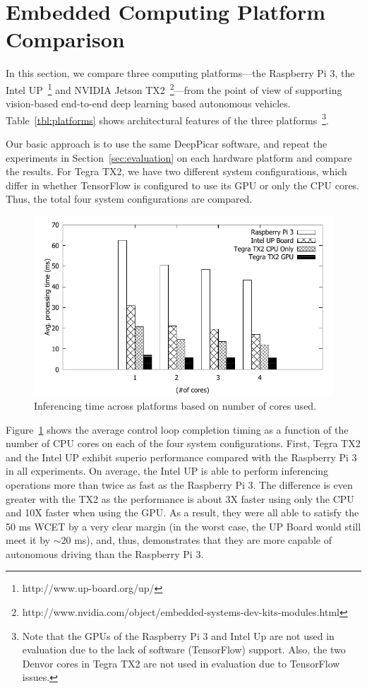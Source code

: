 
%

\section{Embedded Computing Platform Comparison}\label{sec:comparison}

In this section, we compare three computing platforms---the Raspberry
Pi 3, the Intel UP~\footnote{http://www.up-board.org/up/} and NVIDIA
Jetson
TX2~\footnote{http://www.nvidia.com/object/embedded-systems-dev-kits-modules.html}---from
the point of view of supporting vision-based end-to-end deep learning
based autonomous vehicles. 
Table~\ref{tbl:platforms} shows architectural features of the three
platforms~\footnote{Note that the GPUs of the Raspberry Pi 3 and Intel
  Up are not used in evaluation due to the lack of software (TensorFlow)
support. Also, the two Denvor cores in Tegra TX2 are not used in
evaluation due to TensorFlow issues.}.
  
Our basic approach is to use the same DeepPicar software, and repeat
the experiments in Section~\ref{sec:evaluation} on each hardware
platform and compare the results. 
For Tegra TX2, we have two different system configurations,
which differ in whether TensorFlow is configured to use its GPU or
only the CPU cores. Thus, the total four system configurations are
compared.

\begin{figure}[h]
  \centering
  \includegraphics[width=.5\textwidth]{figs/compare_core}
  \caption{Inferencing time across platforms based on number of cores 
used.}
  \label{fig:sys_core}
\end{figure}

Figure~\ref{fig:sys_core} shows the average control loop completion
timing as a function of the number of CPU cores on each of the four
system configurations. First, Tegra TX2 and the Intel UP exhibit
superio performance  compared with the Raspberry Pi 3 in 
all experiments. On average, the Intel UP is able to perform
inferencing operations more than twice as fast as the Raspberry Pi
3. The  difference is even greater with the TX2 as the performance is
about 3X faster using only the CPU and 10X faster when using the GPU.
As a result, they were all able to satisfy the 50 ms 
WCET by a very clear margin (in the worst case, the UP Board would 
still meet it by $\sim$20 ms), and, thus, demonstrates that they are 
more capable of autonomous driving than the Raspberry Pi 3.

